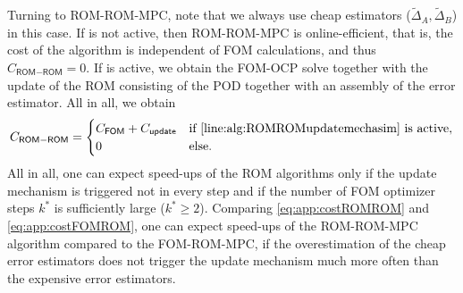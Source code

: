 \documentclass[reqno]{amsart}
\newcommand{\abbr}[1]{\textsf{#1}\xspace}
\newcommand{\FOM}{\abbr{FOM}}
\newcommand{\ROM}{\abbr{ROM}}
\newcommand{\MPC}{\abbr{MPC}}
\newcommand{\OCP}{\abbr{OCP}}
\newcommand{\POD}{\abbr{POD}} %
\newcommand{\cost}{C}
\newcommand{\costFOM}{\cost_{\FOM}}
\newcommand{\costROMROM}{\cost_{\ROM-\ROM}}
\newcommand{\costUpdate}{\cost_{\textsf{update}}}
\begin{document}
{Turning to \ROM-\ROM-\MPC, note that we always use cheap estimators ($\tilde \Delta_A,\tilde \Delta_B$) in this case. If  is not active, then \ROM-\ROM-\MPC is online-efficient, that is, the cost of the algorithm is independent of \FOM calculations, and thus $\costROMROM=0$. If  is active, we obtain the \FOM-\OCP solve together with the update of the \ROM consisting of the \POD together with an assembly of the error estimator. All in all, we obtain
%
\begin{equation}\label{eq:app:costROMROM}
\costROMROM=
\begin{cases}
        \costFOM + \costUpdate &\text{if \Cref{line:alg:ROMROMupdatemechasim} is active},\\
        0&\text{else}.
	\end{cases}
\end{equation}
%
All in all, one can expect speed-ups of the \ROM algorithms only if the update mechanism is triggered not in every step and if the number of \FOM optimizer steps $ k^*$ is sufficiently large ($ k^*\geq 2$). Comparing \eqref{eq:app:costROMROM} and \eqref{eq:app:costFOMROM}, one can expect speed-ups of the \ROM-\ROM-\MPC algorithm compared to the \FOM-\ROM-\MPC, if the overestimation of the cheap error estimators does not trigger the update mechanism much more often than the expensive error estimators.
}
\end{document}
